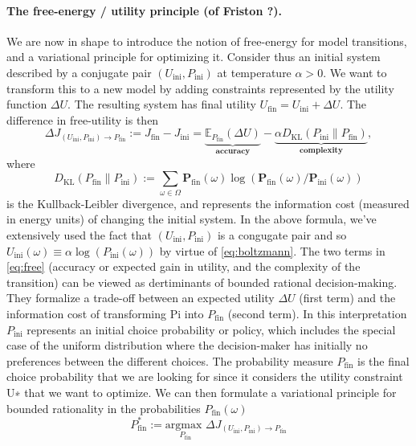 \documentclass{article} %
\def\P{\mathbf{P}}
\begin{document}
  \paragraph{The free-energy / utility principle (of Friston ?).}
  We are now in shape to introduce the notion of free-energy for model transitions, and a variational principle for optimizing it. Consider thus an initial system described by a conjugate pair $(U_{\text{ini}}, P_{\text{ini}})$ at temperature $\alpha > 0$. We want to transform this to a new model by adding constraints represented by the utility function $\Delta U$.  The resulting system has final utility $U_{\text{fin}} = U_{\text{ini}} + \Delta U$. The difference in free-utility is then
  \begin{equation}
    \Delta J_{(U_{\text{ini}}, P_{\text{ini}}) \rightarrow P_{\text{fin}}} := J_{\text{fin}} - J_{\text{ini}} = \underbrace{\mathbb E_{P_{\text{fin}}}(\Delta U)}_{\textbf{accuracy}} -  \underbrace{\alpha D_{\text{KL}}(P_{\text{ini}}\|P_{\text{fin}})}_{\textbf{complexity}},
    \label{eq:free}
  \end{equation}
  where
  \begin{equation}
    D_{\text{KL}}(P_{\text{fin}}\|P_{\text{ini}}) := \sum_{\omega \in \Omega}\P_{\text{fin}}(\omega)\log(\P_{\text{fin}}(\omega)/\P_{\text{ini}}(\omega))
  \end{equation}
  is the Kullback-Leibler divergence, and represents the information cost (measured in energy units) of changing the initial system.
In the above formula, we've extensively used the fact that $(U_{\text{ini}}, P_{\text{ini}})$ is a congugate pair and so $U_{\text{ini}}(\omega) \equiv \alpha \log(P_{\text{ini}}(\omega))$ by virtue of \eqref{eq:boltzmann}.
  The two terms in \eqref{eq:free} (accuracy or expected gain in utility, and the complexity of the transition) can be viewed as dertiminants of bounded rational decision-making. They formalize
a trade-off between an expected utility $\Delta U$ (first term) and
the information cost of transforming Pi
into $P_{\text{fin}}$ (second
term). In this interpretation $P_{\text{ini}}$ represents an initial choice
probability or policy, which includes the special case of the
uniform distribution where the decision-maker has initially no
preferences between the different choices. The probability measure $P_{\text{fin}}$ is the final choice probability that we are looking for since it
considers the utility constraint U∗
that we want to optimize. We can then formulate a variational principle for bounded rationality in the probabilities $P_{\text{fin}}(\omega)$
\begin{equation}
P^*_{\text{fin}} := \underset{P_{\text{fin}}}{\text{argmax }} \Delta J_{(U_{\text{ini}}, P_{\text{ini}}) \rightarrow P_{\text{fin}}}
  \end{equation}
\end{document}

